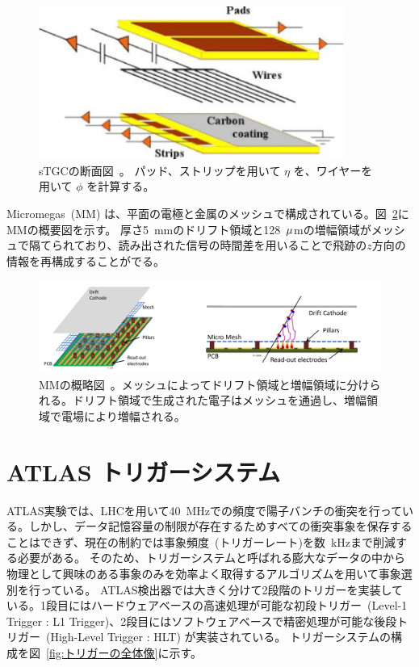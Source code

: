 \begin{figure}[tb]
  \centering
  \includegraphics[clip, width=10cm]{fig/2/stgc-structure.pdf}
  \caption{sTGCの断面図~\cite{article:NSW_tech}。 パッド、ストリップを用いて $\eta$ を、ワイヤーを用いて $\phi$ を計算する。}
  \label{fig:sTGC}
\end{figure}

Micromegas~(MM) は、平面の電極と金属のメッシュで構成されている。図~\ref{fig:MM}にMMの概要図を示す。
厚さ5~mmのドリフト領域と128~$\rm{\mu}$mの増幅領域がメッシュで隔てられており、読み出された信号の時間差を用いることで飛跡の$z$方向の情報を再構成することがでる。

\begin{figure}[tb]
  \centering
  \includegraphics[clip, width=15cm]{fig/2/mm-structure.pdf}
  \caption{MMの概略図~\cite{article:NSW_tech}。メッシュによってドリフト領域と増幅領域に分けられる。ドリフト領域で生成された電子はメッシュを通過し、増幅領域で電場により増幅される。}
  \label{fig:MM}
\end{figure}


\newpage
\section{ATLAS トリガーシステム}
ATLAS実験では、LHCを用いて40~MHzでの頻度で陽子バンチの衝突を行っている。しかし、データ記憶容量の制限が存在するためすべての衝突事象を保存することはできず、現在の制約では事象頻度~(トリガーレート)を数~kHzまで削減する必要がある。
そのため、トリガーシステムと呼ばれる膨大なデータの中から物理として興味のある事象のみを効率よく取得するアルゴリズムを用いて事象選別を行っている。
ATLAS検出器では大きく分けて2段階のトリガーを実装している。1段目にはハードウェアベースの高速処理が可能な初段トリガー~(Level-1 Trigger : L1 Trigger)、2段目にはソフトウェアベースで精密処理が可能な後段トリガー~(High-Level Trigger : HLT) が実装されている。
トリガーシステムの構成を図~\ref{fig:トリガーの全体像}に示す。

